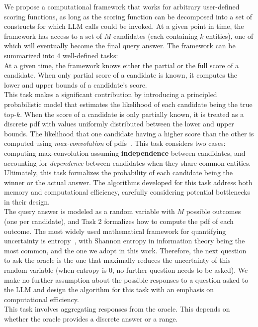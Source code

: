 \smallskip {} We propose a computational framework that works for arbitrary user-defined scoring functions, as long as the scoring function can be decomposed into a set of constructs for which LLM calls could be invoked. At a given point in time, the framework has access to a set of $M$ candidates (each containing $k$ entities), one of which will eventually become the final query answer. The framework can be summarized into $4$ well-defined tasks:\\
 At a given time, the framework knows either the partial or the full score of a candidate. When only partial score of a candidate is known, it computes the lower and upper bounds of a candidate's score. \\ %
 This task makes a significant contribution by introducing a principled probabilistic model that estimates the likelihood of each candidate being the true top-$k$. When the score of a candidate is only partially known, it is treated as a discrete pdf with values uniformly distributed between the lower and upper bounds. The likelihood that one candidate having a higher score than the other is computed using {\em max-convolution} of pdfs~\cite{rahman2015worker}. This task considers two cases: computing max-convolution assuming {\bf independence} between candidates, and accounting for {\it dependence} between candidates when they share common entities. Ultimately, this task formalizes the probability of each candidate being the winner or the actual answer. The algorithms developed for this task address both memory and computational efficiency, carefully considering potential bottlenecks in their design.\\
 The  query answer is modeled as a random variable with $M$ possible outcomes (one per candidate), and Task 2 formalizes how to compute the pdf of each outcome. The most widely used mathematical framework for quantifying uncertainty is entropy~\cite{renyi1961measures}, with Shannon entropy in information theory being the most common, and the one we adopt in this work. Therefore, the next question to ask the oracle is the one that maximally reduces the uncertainty of this random variable (when entropy is $0$, no further question needs to be asked). We make no further assumption about the possible responses to a question asked to the LLM and design the algorithm for this task with an emphasis on computational efficiency.\\
 This task involves aggregating responses from the oracle. This depends on whether the oracle provides a discrete answer or a range. 

